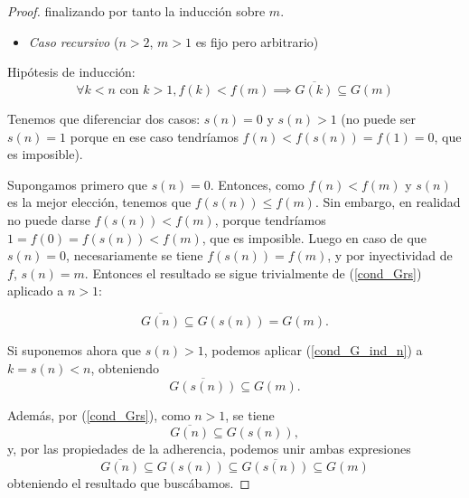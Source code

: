 \documentclass{article}
\newcommand{\pref}[1]{(\ref{#1})}
\begin{document}
\begin{proof}
finalizando por tanto la inducción sobre $m$.

\begin{itemize}
  \item \textit{Caso recursivo} ($n > 2$, $m>1$ es fijo pero arbitrario)
\end{itemize}

Hipótesis de inducción:
\begin{equation} \label{cond_G_ind_n}
  \forall k < n \text{ con } k > 1, f(k) < f(m) \implies \overline{G(k)} \subseteq G(m)
\end{equation}

Tenemos que diferenciar dos casos: $s(n) = 0$ y $s(n) > 1$ (no puede ser $s(n) = 1$ porque en ese caso tendríamos $f(n) < f(s(n)) = f(1) = 0$, que es imposible).

Supongamos primero que $s(n) = 0$. Entonces, como $f(n) < f(m)$ y $s(n)$ es la mejor elección, tenemos que $f(s(n)) \leq f(m)$. Sin embargo, en realidad no puede darse $f(s(n)) < f(m)$, porque tendríamos $1 = f(0) = f(s(n)) < f(m)$, que es imposible. Luego en caso de que $s(n)=0$, necesariamente se tiene $f(s(n)) = f(m)$, y por inyectividad de $f$, $s(n) = m$. Entonces el resultado se sigue trivialmente de \pref{cond_Grs} aplicado a $n>1$:

$$
  \overline{G(n)} \subseteq G(s(n)) = G(m).
$$

Si suponemos ahora que $s(n)>1$, podemos aplicar \pref{cond_G_ind_n} a $k = s(n) < n$, obteniendo $$\overline{G(s(n))} \subseteq G(m).$$

Además, por \pref{cond_Grs}, como $n > 1$, se tiene $$\overline{G(n)} \subseteq G(s(n)),$$ y, por las propiedades de la adherencia, podemos unir ambas expresiones $$\overline{G(n)} \subseteq G(s(n)) \subseteq \overline{G(s(n))} \subseteq G(m)$$ obteniendo el resultado que buscábamos.


\end{proof}




\end{document}

